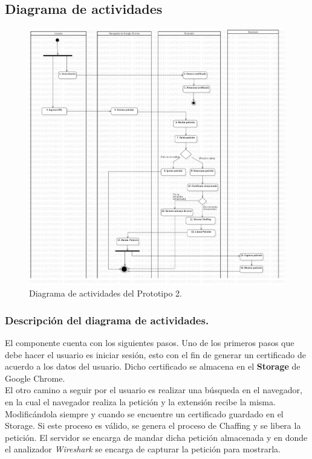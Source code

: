 \documentclass[12pt, a4paper, titlepage]{report}
\begin{document}
		    \subsection{Diagrama de actividades}
    		    \begin{figure}[H]
    				\begin{center}	\includegraphics[width=15cm]{./imagenes/Disenio/Componente_1/CI_DA.png}
    					\caption{Diagrama de actividades del Prototipo 2.}
    				\end{center}
    			\end{figure}
    		
        		\subsubsection{Descripción del diagrama de actividades.}
        		El componente cuenta con los siguientes pasos.
            	Uno de los primeros pasos que debe hacer el usuario es iniciar sesión, esto con el fin de generar un certificado de acuerdo a los datos del usuario. Dicho certificado se almacena en el \textbf{Storage} de Google Chrome. \\
            	El otro camino a seguir por el usuario es realizar una búsqueda en el navegador, en la cual el navegador realiza la petición y la extensión recibe la misma. Modificándola siempre y cuando se encuentre un certificado guardado en el Storage. Si este proceso es válido, se genera el proceso de Chaffing y se libera la petición. El servidor se encarga de mandar dicha petición almacenada y en donde el analizador \textit{Wireshark} se encarga de capturar la petición para mostrarla.
			
\end{document}
